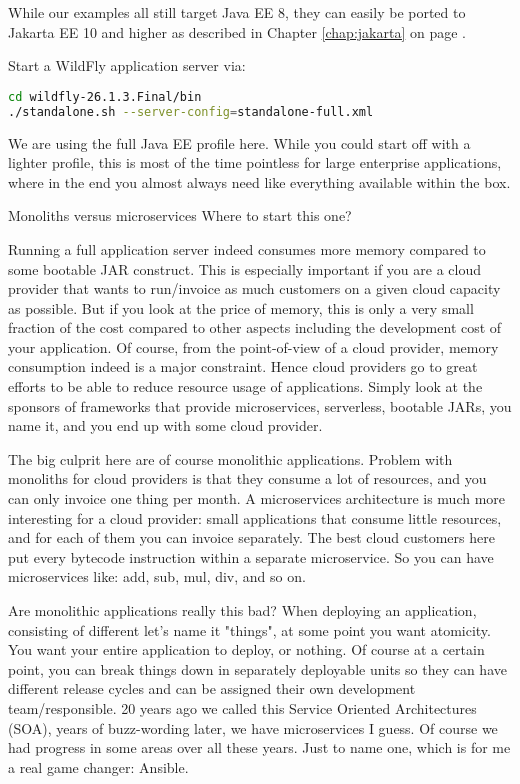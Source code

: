 While our examples all still target Java EE 8, they can easily be ported to Jakarta EE 10 and higher as described in Chapter \ref{chap:jakarta} on page \pageref{chap:jakarta}.

Start a WildFly \cite{WildFly} application server via:
\begin{lstlisting}[language=bash]
cd wildfly-26.1.3.Final/bin
./standalone.sh --server-config=standalone-full.xml
\end{lstlisting}
We are using the full Java EE profile here.
While you could start off with a lighter profile, this is most of the time pointless for large enterprise applications, where in the end you almost always need like everything available within the box.
\begin{ClownComputing}{Monoliths versus microservices}
	Where to start this one?
	
	Running a full application server indeed consumes more memory compared to some bootable JAR construct.
	This is especially important if you are a cloud provider that wants to run/invoice as much customers on a given cloud capacity as possible.
	But if you look at the price of memory, this is only a very small fraction of the cost compared to other aspects including the development cost of your application.
	Of course, from the point-of-view of a cloud provider, memory consumption indeed is a major constraint.
	Hence cloud providers go to great efforts to be able to reduce resource usage of applications.
	Simply look at the sponsors of frameworks that provide microservices, serverless, bootable JARs, you name it,
	and you end up with some cloud provider.
	
	The big culprit here are of course monolithic applications.
	Problem with monoliths for cloud providers is that they consume a lot of resources, and you can only invoice one thing per month.
	A microservices architecture is much more interesting for a cloud provider: small applications that consume little resources,
	and for each of them you can invoice separately.
	The best cloud customers here put every bytecode instruction within a separate microservice.
	So you can have microservices like: add, sub, mul, div, and so on.
	
	Are monolithic applications really this bad?
	When deploying an application, consisting of different let's name it "things", at some point you want atomicity.
	You want your entire application to deploy, or nothing.
	Of course at a certain point, you can break things down in separately deployable units so they can have different release cycles and can be assigned their own development team/responsible.
	20 years ago we called this Service Oriented Architectures (SOA), years of buzz-wording later, we have microservices I guess.
	Of course we had progress in some areas over all these years. Just to name one, which is for me a real game changer: Ansible.
	

\end{ClownComputing}
